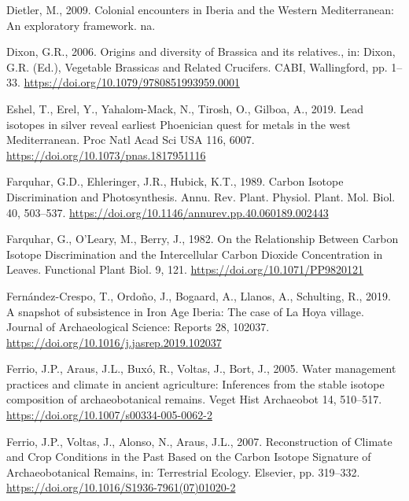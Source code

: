 \documentclass[preprint, 3p, authoryear]{elsarticle} %
\newlength{\cslhangindent}
\newlength{\cslentryspacingunit} %
\newenvironment{CSLReferences}[2] %
 {%
  \setlength{\parindent}{0pt}
  \ifodd #1
  \let\oldpar\par
  \def\par{\hangindent=\cslhangindent\oldpar}
  \fi
  \setlength{\parskip}{#2\cslentryspacingunit}
 }%
 {}
\begin{document}
\begin{CSLReferences}{1}{0}
\leavevmode{}%
Dietler, M., 2009. Colonial encounters in {Iberia} and the {Western Mediterranean}: {An} exploratory framework. {na}.

\leavevmode{}%
Dixon, G.R., 2006. Origins and diversity of {Brassica} and its relatives., in: Dixon, G.R. (Ed.), Vegetable Brassicas and Related Crucifers. {CABI}, {Wallingford}, pp. 1--33. \url{https://doi.org/10.1079/9780851993959.0001}

\leavevmode{}%
Eshel, T., Erel, Y., Yahalom-Mack, N., Tirosh, O., Gilboa, A., 2019. Lead isotopes in silver reveal earliest {Phoenician} quest for metals in the west {Mediterranean}. Proc Natl Acad Sci USA 116, 6007. \url{https://doi.org/10.1073/pnas.1817951116}

\leavevmode{}%
Farquhar, G.D., Ehleringer, J.R., Hubick, K.T., 1989. Carbon {Isotope Discrimination} and {Photosynthesis}. Annu. Rev. Plant. Physiol. Plant. Mol. Biol. 40, 503--537. \url{https://doi.org/10.1146/annurev.pp.40.060189.002443}

\leavevmode{}%
Farquhar, G., O'Leary, M., Berry, J., 1982. On the {Relationship Between Carbon Isotope Discrimination} and the {Intercellular Carbon Dioxide Concentration} in {Leaves}. Functional Plant Biol. 9, 121. \url{https://doi.org/10.1071/PP9820121}

\leavevmode{}%
Fernández-Crespo, T., Ordoño, J., Bogaard, A., Llanos, A., Schulting, R., 2019. A snapshot of subsistence in {Iron Age Iberia}: {The} case of {La Hoya} village. Journal of Archaeological Science: Reports 28, 102037. \url{https://doi.org/10.1016/j.jasrep.2019.102037}

\leavevmode{}%
Ferrio, J.P., Araus, J.L., Buxó, R., Voltas, J., Bort, J., 2005. Water management practices and climate in ancient agriculture: Inferences from the stable isotope composition of archaeobotanical remains. Veget Hist Archaeobot 14, 510--517. \url{https://doi.org/10.1007/s00334-005-0062-2}

\leavevmode{}%
Ferrio, J.P., Voltas, J., Alonso, N., Araus, J.L., 2007. Reconstruction of {Climate} and {Crop Conditions} in the {Past Based} on the {Carbon Isotope Signature} of {Archaeobotanical Remains}, in: Terrestrial {Ecology}. {Elsevier}, pp. 319--332. \url{https://doi.org/10.1016/S1936-7961(07)01020-2}


\end{CSLReferences}
\end{document}
